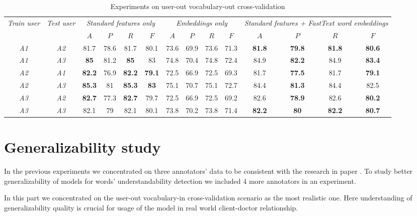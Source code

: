 \begin{table*}[h]
\begin{tabular}{cc|cccc|cccc|cccc}
\multirow{2}{0.6cm}{\textit{Train user}} & \multirow{2}{0.6cm}{\textit{Test user}} & \multicolumn{4}{c|}{\textit{Standard features only}} & \multicolumn{4}{c|}{\textit{Embeddings only}} & \multicolumn{4}{X}{\textit{Standard features + FastText word embeddings}} \\ \cline{3-14} 
 &  & $A$ & $P$ & $R$ & $F$ & $A$ & $P$ & $R$ & $F$ & $A$ & $P$ & $R$ & $F$ \\ \hline
\textit{A1} & \textit{A2} & 81.7 & 78.6 & 81.7 & 80.1 & 73.6 & 69.9 & 73.6 & 71.3 & \textbf{81.8} & \textbf{79.8} & \textbf{81.8} & \textbf{80.6} \\ 
\textit{A1} & \textit{A3} & \textbf{85} & 81.2 & \textbf{85} & 83 & 74.8 & 70.4 & 74.8 & 72.4 & 84.9 & \textbf{82.2} & 84.9 & \textbf{83.4} \\ \hline 
\textit{A2} & \textit{A1} & \textbf{82.2} & 76.9 & \textbf{82.2} & \textbf{79.1} & 72.5 & 66.9 & 72.5 & 69.3 & 81.7 & \textbf{77.5} & 81.7 & \textbf{79.1} \\
\textit{A2} & \textit{A3} & \textbf{85.3} & 81 & \textbf{85.3} & \textbf{83} & 75.1 & 70.7 & 75.1 & 72.7 & 84.4 & \textbf{81.3} & 84.4 & 82.5 \\ \hline 
\textit{A3} & \textit{A2} & \textbf{82.7} & 77.3 & \textbf{82.7} & 79.7 & 72.5 & 66.9 & 72.5 & 69.2 & 82.6 & \textbf{78.9} & 82.6 & \textbf{80.2} \\ 
\textit{A3} & \textit{A3} & 82.1 & 79 & 82.1 & 80.1 & 73.8 & 70.2 & 73.8 & 71.4 & \textbf{82.2} & \textbf{80} & \textbf{82.2} & \textbf{80.7} \\ \hline 
\end{tabular}
    \caption{Experiments on user-out vocabulary-out cross-validation}
    \label{tab:user-out-voc-out}
\end{table*}

\section{Generalizability study}
\label{sec:generalizability-study}
In the previous experiments we concentrated on three annotators' data to be consistent with the research in paper \citep{Grabar-PITR2014}. To study better generalizability of models for words' understandability detection we included 4 more annotators in an experiment.

In this part we concentrated on the user-out vocabulary-in cross-validation scenario as the most realistic one. Here understanding of generalizability quality is crucial for usage of the model in real world client-doctor relationship.

